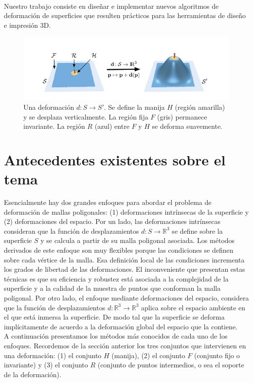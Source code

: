 \documentclass{article}
\begin{document}
\

Nuestro trabajo consiste en diseñar e implementar nuevos algoritmos de 
deformación de superficies que resulten prácticos para las herramientas 
de diseño e impresión 3D.

\begin{figure}
	\includegraphics[scale=.5]{deformacion.png} %
	\caption{Una deformación $d: S \rightarrow S'$. Se define la manija 
	$H$ (región amarilla) y se desplaza verticalmente. La región 
	fija $F$ (gris) permanece invariante. La región $R$ (azul) entre $F$ 
	y $H$ se deforma suavemente.}%
	\label{fig:def} %
\end{figure}

\section{Antecedentes existentes sobre el tema}

Esencialmente hay dos grandes enfoques para abordar el problema 
de deformación de mallas poligonales: (1) deformaciones intrínsecas de la 
superficie y (2) deformaciones del espacio. Por un lado, las deformaciones 
intrínsecas consideran que la 
función de desplazamientos $d: S \rightarrow \mathbb{R}^3$ se define sobre 
la superficie $S$ y se calcula a partir de su malla poligonal asociada. Los 
métodos derivados de este enfoque son muy flexibles porque las condiciones 
se definen sobre cada vértice de la malla. Esa definición local de las 
condiciones incrementa los grados de libertad de las deformaciones. El inconveniente 
que presentan estas técnicas es que su eficiencia y robustez está asociada 
a la complejidad de la superficie y a la calidad de la muestra de puntos 
que conforman la malla poligonal. Por otro lado, el enfoque mediante deformaciones 
del espacio, considera que la función de desplazamientos $d: \mathbb{R}^3 
\rightarrow \mathbb{R}^3$ aplica sobre el espacio ambiente en el que está 
inmersa la superficie. De modo tal que la superficie se deforma implícitamente 
de acuerdo a la deformación global del espacio que la contiene. \\
A continuación presentamos los métodos más conocidos de cada uno de los  
enfoques. Recordemos de la sección anterior los tres conjuntos que intervienen 
en una deformación: (1) el conjunto $H$ (manija), (2) el conjunto $F$ (conjunto 
fijo o invariante) y (3) el conjunto $R$ (conjunto de puntos intermedios, 
o sea el soporte de la deformación).
\end{document}
